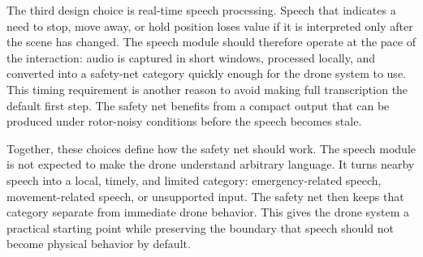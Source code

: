 The third design choice is real-time speech processing. Speech that indicates a need to stop, move away, or hold position loses value if it is interpreted only after the scene has changed. The speech module should therefore operate at the pace of the interaction: audio is captured in short windows, processed locally, and converted into a safety-net category quickly enough for the drone system to use. This timing requirement is another reason to avoid making full transcription the default first step. The safety net benefits from a compact output that can be produced under rotor-noisy conditions before the speech becomes stale.

Together, these choices define how the safety net should work. The speech module is not expected to make the drone understand arbitrary language. It turns nearby speech into a local, timely, and limited category: emergency-related speech, movement-related speech, or unsupported input. The safety net then keeps that category separate from immediate drone behavior. This gives the drone system a practical starting point while preserving the boundary that speech should not become physical behavior by default.
